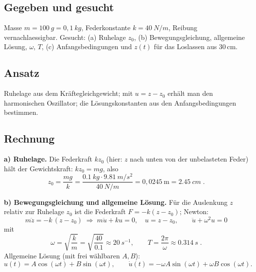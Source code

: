 
\subsection*{Gegeben und gesucht}
Masse $m=\qty{100}{g}=0{,}1\ \unit{kg}$, Federkonstante
$k=\qty{40}{N/m}$, Reibung vernachlaessigbar. Gesucht: (a) Ruhelage $z_0$,
(b) Bewegungsgleichung, allgemeine Lösung, $\omega$, $T$,
(c) Anfangsbedingungen und $z(t)$ für das Loslassen aus $30\,\mathrm{cm}$.

\subsection*{Ansatz}
Ruhelage aus dem Kräftegleichgewicht; mit $u=z-z_0$ erhält man den
harmonischen Oszillator; die Lösungskonstanten aus den
Anfangsbedingungen bestimmen.

\subsection*{Rechnung}
\textbf{a) Ruhelage.} Die Federkraft $k z_0$ (hier: $z$ nach unten von der
unbelasteten Feder) hält der Gewichtskraft: $k z_0=m g$, also
\begin{equation}
  z_0=\frac{m g}{k}
  =\frac{\qty{0.1}{kg}\cdot\qty{9.81}{m/s^2}}{\qty{40}{N/m}}
  =0{,}0245\ \mathrm m=\qty{2.45}{cm}\;.
\end{equation}

\textbf{b) Bewegungsgleichung und allgemeine Lösung.} Für die Auslenkung
$z$ relativ zur Ruhelage $z_0$ ist die Federkraft $F=-k(z-z_0)$; Newton:
\begin{equation}
  m\ddot z=-k\,(z-z_0)
  \;\Rightarrow\;
  m\ddot u+k u=0,\quad u=z-z_0,\qquad
  \ddot u+\omega^2u=0
\end{equation}
mit
\begin{equation}
  \omega=\sqrt{\frac{k}{m}}=\sqrt{\frac{40}{0.1}}\approx\qty{20}{s^{-1}},
  \qquad
  T=\frac{2\pi}{\omega}\approx\qty{0.314}{s}\;.
\end{equation}
Allgemeine Lösung (mit frei wählbaren $A,B$):
\begin{equation}
  u(t)=A\cos(\omega t)+B\sin(\omega t),\qquad
  \dot u(t)=-\omega A\sin(\omega t)+\omega B\cos(\omega t).
\end{equation}

